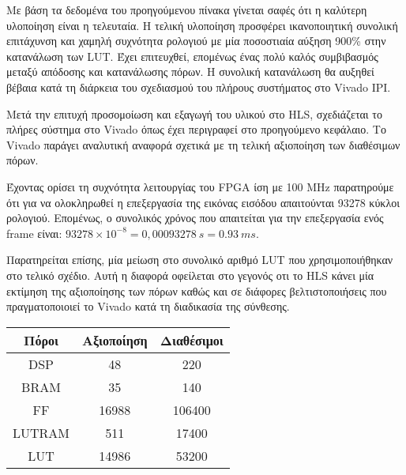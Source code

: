 \iffalse
\begin{figure}[H]
	\begin{center}
		\begin{tikzpicture}
			\begin{axis}[	xbar,
						    y axis line style 	= { opacity = 0 },
						    tickwidth         	= 0pt,
						    enlarge y limits  	= 0.2,
						    enlarge x limits  	= 0.02,
						    nodes near coords,
						    xmin 				= 0,
						    xmax 				= 100,
						    symbolic y coords 	= {LUT, FF, BRAM, DSP}]

	  			\addplot coordinates { (8,LUT)  	(2,FF)  	(22,BRAM) 	(3,DSP) };
	  			\addplot coordinates { (41,LUT)  	(11,FF) 	(22,BRAM) 	(6,DSP) };
	  			\addplot coordinates { (56,LUT)  	(13,FF) 	(28,BRAM) 	(13,DSP) };

	        \end{axis}
		\end{tikzpicture}
	\end{center}
	\caption{Ποσοστό αξιοποίησης πόρων συνάρτησης}
\end{figure}
\fi
Με βάση τα δεδομένα του προηγούμενου πίνακα γίνεται σαφές ότι η καλύτερη υλοποίηση είναι η τελευταία. Η τελική υλοποίηση προσφέρει ικανοποιητική συνολική επιτάχυνση και χαμηλή συχνότητα ρολογιού με μία ποσοστιαία αύξηση 900\% στην κατανάλωση των LUT. Έχει επιτευχθεί, επομένως ένας πολύ καλός συμβιβασμός μεταξύ απόδοσης και κατανάλωσης πόρων. Η συνολική κατανάλωση θα αυξηθεί βέβαια κατά τη διάρκεια του σχεδιασμού του πλήρους συστήματος στο Vivado IPI.

Μετά την επιτυχή προσομοίωση και εξαγωγή του υλικού στο HLS, σχεδιάζεται το πλήρες σύστημα στο Vivado όπως έχει περιγραφεί στο προηγούμενο κεφάλαιο. Το Vivado παράγει αναλυτική αναφορά σχετικά με τη τελική αξιοποίηση των διαθέσιμων πόρων.

Έχοντας ορίσει τη συχνότητα λειτουργίας του FPGA ίση με 100 MHz παρατηρούμε ότι για να ολοκληρωθεί η επεξεργασία της εικόνας εισόδου απαιτούνται 93278 κύκλοι ρολογιού. Επομένως, ο συνολικός χρόνος που απαιτείται για την επεξεργασία ενός frame είναι: $93278\times 10^{-8}= 0,00093278\ s = 0.93\ ms$.

Παρατηρείται επίσης, μία μείωση στο συνολικό αριθμό LUT που χρησιμοποιήθηκαν στο τελικό σχέδιο. Αυτή η διαφορά οφείλεται στο γεγονός οτι το HLS κάνει μία εκτίμηση της αξιοποίησης των πόρων καθώς και σε διάφορες βελτιστοποιήσεις που πραγματοποιοιεί το Vivado κατά τη διαδικασία της σύνθεσης.

\begin{table}[H]
\centering
\label{my-label}
\begin{tabular}{@{}c|c|c@{}}
\toprule
Πόροι & Αξιοποίηση & \multicolumn{1}{l}{Διαθέσιμοι} \\ \midrule
DSP & 48 & 220 \\
BRAM & 35 & 140 \\
FF & 16988 & 106400 \\
LUTRAM & 511 & 17400 \\
LUT & 14986 & 53200 \\ \bottomrule
\end{tabular}
\end{table}

